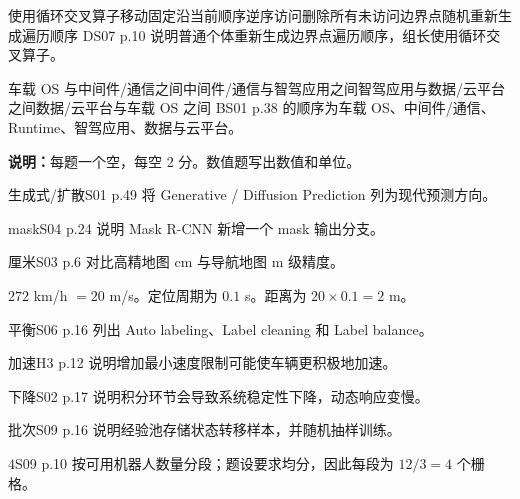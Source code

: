 {使用循环交叉算子移动}{固定沿当前顺序逆序访问}{删除所有未访问边界点}{随机重新生成遍历顺序}
{D}{S07 p.10 说明普通个体重新生成边界点遍历顺序，组长使用循环交叉算子。}

{车载 OS 与中间件/通信之间}{中间件/通信与智驾应用之间}{智驾应用与数据/云平台之间}{数据/云平台与车载 OS 之间}
{B}{S01 p.38 的顺序为车载 OS、中间件/通信、Runtime、智驾应用、数据与云平台。}

\exampagebreak
{}
\textbf{说明：}每题一个空，每空 2 分。数值题写出数值和单位。

{生成式/扩散}{S01 p.49 将 Generative / Diffusion Prediction 列为现代预测方向。}

{mask}{S04 p.24 说明 Mask R-CNN 新增一个 mask 输出分支。}

{厘米}{S03 p.6 对比高精地图 cm 与导航地图 m 级精度。}

{$2$}{$72$ km/h $=20$ m/s。定位周期为 $0.1$ s。距离为 $20\times0.1=2$ m。}

{平衡}{S06 p.16 列出 Auto labeling、Label cleaning 和 Label balance。}

{加速}{H3 p.12 说明增加最小速度限制可能使车辆更积极地加速。}

{下降}{S02 p.17 说明积分环节会导致系统稳定性下降，动态响应变慢。}

{批次}{S09 p.16 说明经验池存储状态转移样本，并随机抽样训练。}

{$4$}{S09 p.10 按可用机器人数量分段；题设要求均分，因此每段为 $12/3=4$ 个栅格。}

